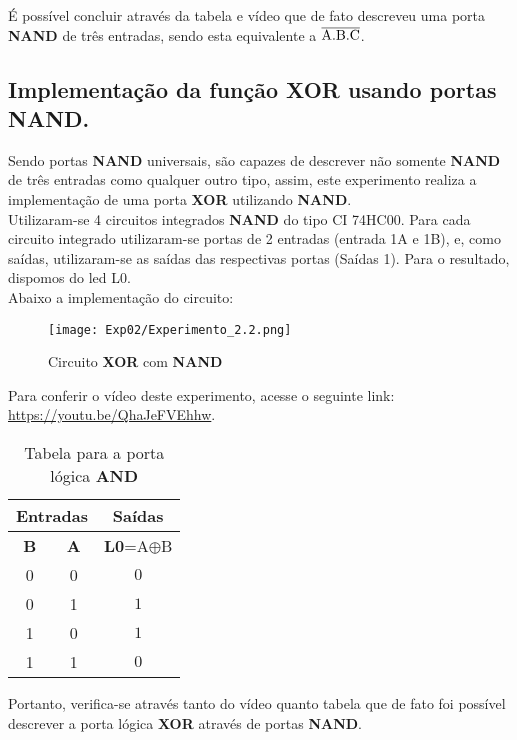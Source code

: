 \documentclass[12pt]{article}
\begin{document}
É possível concluir através da tabela e vídeo que de fato descreveu uma porta \textbf{NAND} de três entradas, sendo esta equivalente a $\overline{\rm A.B.C}$.
\\[2em]

\subsection{Implementação da função \textbf{XOR} usando portas \textbf{NAND}.}\label{sec:and_e_or}

Sendo portas \textbf{NAND} universais, são capazes de descrever não somente \textbf{NAND} de três entradas como qualquer outro tipo, assim, este experimento realiza a implementação de uma porta \textbf{XOR} utilizando \textbf{NAND}.\\
Utilizaram-se 4 circuitos integrados \textbf{NAND} do tipo CI 74HC00. Para cada circuito integrado utilizaram-se portas de 2 entradas (entrada 1A e 1B), e, como saídas, utilizaram-se as saídas das respectivas portas (Saídas 1). Para o resultado, dispomos do led L0.\\

Abaixo a implementação do circuito:
\begin{figure}[H]
    \centering
    \texttt{[image: Exp02/Experimento\_2.2.png]}
    \caption{Circuito \textbf{XOR} com \textbf{NAND}}\label{fig:Esquema_Experimento2_2.2}
\end{figure}
Para conferir o vídeo deste experimento, acesse o seguinte link:
\href{https://youtu.be/QhaJeFVEhhw}{https://youtu.be/QhaJeFVEhhw}.

\begin{table}[H]
    \centering
    \caption{Tabela para a porta lógica \textbf{AND}}
    \begin{tabular}{|c|c|c|}
    \hline
        \multicolumn{2}{|c|}{Entradas} & \multicolumn{1}{c|}{Saídas}\\
    \hline
    \textbf{B} & \textbf{A} & \textbf{L0}=A$\oplus$B \\
    \hline
    0  & 0 & \(0\) \\
    \hline
    0  & 1 & \(1\) \\
    \hline
    1  & 0 & \(1\) \\
    \hline
    1  & 1 & \(0\) \\
    \hline
    \end{tabular}\label{tab:tabela_and}
\end{table}

Portanto, verifica-se através tanto do vídeo quanto tabela que de fato foi possível descrever a porta lógica \textbf{XOR} através de portas \textbf{NAND}.\\[2em]
\end{document}
